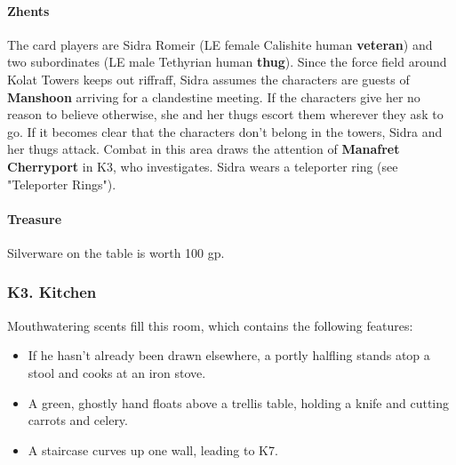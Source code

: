 \documentclass[10pt,a4paper,twoside,twocolumn,openany,nodeprecatedcode]{dndbook}
\begin{document}
\paragraph{Zhents}
The card players are Sidra Romeir (LE female Calishite human \textbf{veteran}) and two subordinates (LE male Tethyrian human \textbf{thug}). Since the force field around Kolat Towers keeps out riffraff, Sidra assumes the characters are guests of \textbf{Manshoon} arriving for a clandestine meeting. If the characters give her no reason to believe otherwise, she and her thugs escort them wherever they ask to go. If it becomes clear that the characters don't belong in the towers, Sidra and her thugs attack. Combat in this area draws the attention of \textbf{Manafret Cherryport} in K3, who investigates.
Sidra wears a teleporter ring (see "Teleporter Rings").
\paragraph{Treasure}
Silverware on the table is worth 100 gp.
\subsubsection{K3. Kitchen}
Mouthwatering scents fill this room, which contains the following features:
\begin{itemize}

\item If he hasn't already been drawn elsewhere, a portly halfling stands atop a stool and cooks at an iron stove.
\item A green, ghostly hand floats above a trellis table, holding a knife and cutting carrots and celery.
\item A staircase curves up one wall, leading to K7.
\end{itemize}
\end{document}
